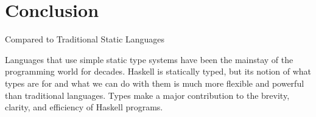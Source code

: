 
\section{Conclusion}

%
\begin{frame}{Compared to Traditional Static Languages}

Languages that use simple static type systems have been the mainstay of the programming world for decades. Haskell is statically typed, but its notion of what types are for and what we can do with them is much more flexible and powerful than traditional languages. Types make a major contribution to the brevity, clarity, and efficiency of Haskell programs.

% 
% 
% 

\end{frame}

